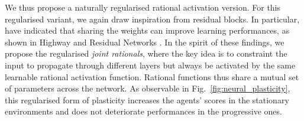 \documentclass[accepted]{article}
\theoremstyle{plain}
\theoremstyle{definition}
\theoremstyle{remark}
\begin{document}
We thus propose a naturally regularised rational activation version. For this regularised variant, we again draw inspiration from residual blocks. In particular, \citeauthor{greff2016highway} have indicated that sharing the weights can improve learning performances, as shown in Highway \citep{lu2016small} and Residual Networks \citep{liao2016bridging}. In the spirit of these findings, we propose the regularised \textit{joint rationals}, where the key idea is to constraint the input to propagate through different layers but always be activated by the same learnable rational activation function. Rational functions thus share a mutual set of parameters across the network. 
As observable in Fig.~\ref{fig:neural_plasticity}, this regularised form of plasticity increases the agents' scores in the stationary environments and does not deteriorate performances in the progressive ones.
\end{document}
